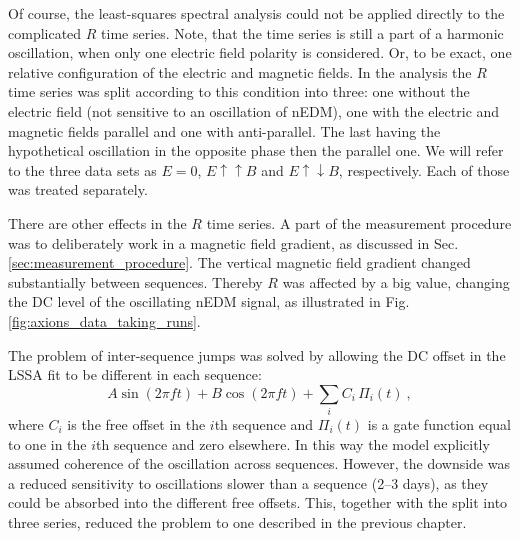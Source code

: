 Of course, the least-squares spectral analysis could not be applied directly to the complicated $R$ time series. Note, that the time series is still a part of a harmonic oscillation, when only one electric field polarity is considered. Or, to be exact, one relative configuration of the electric and magnetic fields. In the analysis the $R$ time series was split according to this condition into three: one without the electric field (not sensitive to an oscillation of nEDM), one with the electric and magnetic fields parallel and one with anti-parallel. The last having the hypothetical oscillation in the opposite phase then the parallel one. We will refer to the three data sets as $E=0$, $E \uparrow \uparrow B$ and $E \uparrow \downarrow B$, respectively. Each of those was treated separately.


There are other effects in the $R$ time series. A part of the measurement procedure was to deliberately work in a magnetic field gradient, as discussed in Sec.\,\ref{sec:measurement_procedure}. The vertical magnetic field gradient changed substantially between sequences. Thereby $R$ was affected by a big value, changing the DC level of the oscillating nEDM signal, as illustrated in Fig.\,\ref{fig:axions_data_taking_runs}.

The problem of inter-sequence jumps was solved by allowing the DC offset in the LSSA fit to be different in each sequence:
\begin{equation}
  \label{eq:axions_LSSA}
  A\sin(2 \pi f t) + B\cos(2 \pi f t) + \sum_i C_i\,\Pi_i(t) \ ,
\end{equation}
where $C_i$ is the free offset in the $i$th sequence and $\Pi_i(t)$ is a gate function equal to one in the $i$th sequence and zero elsewhere. In this way the model explicitly assumed coherence of the oscillation across sequences. However, the downside was a reduced sensitivity to oscillations slower than a sequence (2--3 days), as they could be absorbed into the different free offsets. This, together with the split into three series, reduced the problem to one described in the previous chapter.

